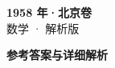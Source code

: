\documentclass[zihao=-4, a4paper]{ctexart}
\begin{document}
\begin{center}
  {\Large\bfseries 1958 年·北京卷}\\[4pt]
  {\large 数学 · 解析版}
\end{center}
\medskip
{}

\clearpage
{}
\begin{center}{\Large\bfseries 参考答案与详细解析}\end{center}
\medskip

\end{document}
